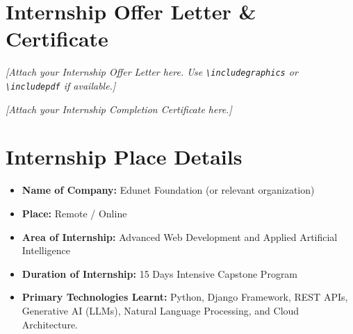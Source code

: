\documentclass[12pt,a4paper]{report}
\begin{document}

\chapter*{Internship Offer Letter \& Certificate}

\textit{[Attach your Internship Offer Letter here. Use \texttt{\textbackslash includegraphics} or \texttt{\textbackslash includepdf} if available.]}

\vspace{10cm}

\textit{[Attach your Internship Completion Certificate here.]}
\newpage

\chapter*{Internship Place Details}

\begin{itemize}[label=\textbf{\textbullet}, itemsep=10pt]
    \item \textbf{Name of Company:} Edunet Foundation (or relevant organization)
    \item \textbf{Place:} Remote / Online
    \item \textbf{Area of Internship:} Advanced Web Development and Applied Artificial Intelligence
    \item \textbf{Duration of Internship:} 15 Days Intensive Capstone Program
    \item \textbf{Primary Technologies Learnt:} Python, Django Framework, REST APIs, Generative AI (LLMs), Natural Language Processing, and Cloud Architecture.
\end{itemize}
\newpage

\tableofcontents
\newpage
\listoffigures
\newpage


\end{document}
